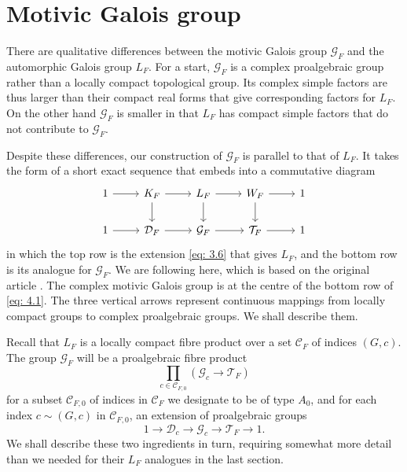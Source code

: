 \documentclass[preprint,12pt, leqno]{elsarticle}
\newcommand{\UGal}{\mathcal{G}_F}
\newcommand{\cD}{\mathcal{D}}
\newcommand{\cT}{\mathcal{T}}
\newcommand{\cC}{\mathcal{C}}
\numberwithin{equation}{section}
\theoremstyle{named}
\begin{document}
\section{Motivic Galois group}\label{sec:motivic galois groups}

There are qualitative differences between the motivic Galois group $\UGal$ and the automorphic Galois group $L_F$. For a start, $\UGal$ is a complex proalgebraic group rather than a locally compact topological group. Its complex simple factors are thus larger than their compact real forms that give corresponding factors for $L_F$. On the other hand $\UGal$ is smaller in that $L_F$ has compact simple factors that do not contribute to $\UGal$.

Despite these differences, our construction of $\UGal$ is parallel to that of $L_F$. It takes the form of a short exact sequence that embeds into a commutative diagram 
\begin{equation}\label{eq: 4.1}
    \begin{tikzcd}
        1 \ar[r] & K_F \ar[r] \ar[d] & L_F \ar[r]\ar[d] & W_F \ar[r]\ar[d] & 1\\
        1 \ar[r] & \cD_F \ar[r] & \UGal \ar[r] & \cT_F \ar[r] & 1
    \end{tikzcd}
\end{equation}
in which the top row is the extension \eqref{eq: 3.6} that gives $L_F$, and the bottom row is its analogue for $\UGal$. We are following \cite[Section 3]{N2} here, which is based on the original article \cite{Ar2}. The complex motivic Galois group is at the centre of the bottom row of \eqref{eq: 4.1}. The three vertical arrows represent continuous mappings from locally compact groups to complex proalgebraic groups. We shall describe them.

Recall that $L_F$ is a locally compact fibre product over a set $\cC_F$ of indices $(G, c)$. The group $\UGal$ will be a proalgebraic fibre product
\begin{equation}\label{eq: 4.2}
    \prod_{c\in\mathcal{C}_{F,0}}(\mathcal{G}_c\longrightarrow \mathcal{T}_F)
\end{equation}
for a subset $\cC_{F, 0}$ of indices in $\cC_F$ we designate to be of type $A_0$, and for each index $c\sim (G, c)$ in $\cC_{F, 0}$, an extension of proalgebraic groups
\begin{equation}\label{eq: 4.3}
    1 \longrightarrow \mathcal{D}_c \longrightarrow \mathcal{G}_c \longrightarrow \mathcal{T}_F \longrightarrow 1.
\end{equation}
We shall describe these two ingredients in turn, requiring somewhat more detail than we needed for their $L_F$ analogues in the last section.
\end{document}
